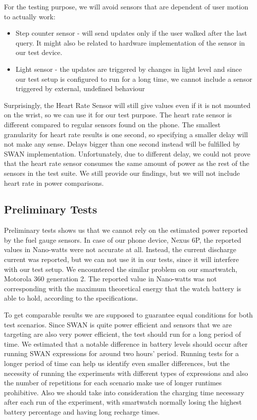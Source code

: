 For the testing purpose, we will avoid sensors that are dependent of user motion to actually work: 
\begin{itemize}
 \item Step counter sensor - will send updates only if the user walked after the last query. It might also be related to hardware implementation of the sensor in our test device\cite{motorolla_stepcounter}. 
 \item Light sensor - the updates are triggered by changes in light level and since our test setup is configured to run for a long time, we cannot include a sensor triggered by external,
 undefined behaviour
\end{itemize}

Surprisingly, the Heart Rate Sensor will still give values even if it is not mounted on the wrist, so we can use it for our test purpose. 
The heart rate sensor is different compared to regular sensors found on the phone. The smallest granularity for heart rate results is one second,
so specifying a smaller delay will not make any sense.  Delays bigger than one second instead will be fulfilled by SWAN implementation.
Unfortunately, due to different delay, we could not prove that the heart rate sensor consumes the same amount of power as the rest of the sensors in the test suite.
We still provide our findings, but we will not include heart rate in power comparisons.
 
 \subsection{Preliminary Tests}
Preliminary tests shows us that we cannot rely on the estimated power reported by the fuel gauge sensors. In case of our phone device,
Nexus 6P, the reported values in Nano-watts were not accurate at all. Instead, the current discharge current was reported, 
but we can not use it in our tests, since it will interfere with our test setup.
We encountered the similar problem on our smartwatch, Motorola 360 generation 2. 
The reported value in Nano-watts was not corresponding with the maximum theoretical energy that the watch battery is able to hold, according to the specifications.

To get comparable results we are supposed to guarantee equal conditions for both test scenarios.
Since SWAN is quite power efficient and sensors that we are targeting are also very power efficient, the test should run for a long period of time.
We estimated that a notable difference in battery levels should occur after running SWAN expressions for around two hours' period.
Running tests for a longer period of time can help us identify even smaller differences, 
but the necessity of running the experiments with different types of expressions and also the number of repetitions for each scenario make use of longer runtimes prohibitive.
Also we should take into consideration the charging time necessary after each run of the experiment,
with smartwatch normally losing the highest battery percentage and having long recharge times.


